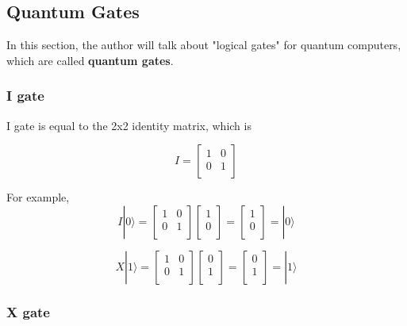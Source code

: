 \subsection{Quantum Gates}

 In this section, the author will talk about "logical gates" for quantum computers, which are called \textbf{quantum gates}.
 
\subsubsection{I gate}

I gate is equal to the 2x2 identity matrix, which is 

$$ I = \begin{bmatrix}
1 & 0 \\
0 & 1 \\
\end{bmatrix}
$$

For example,
$$ I|0\rangle = \begin{bmatrix}
1 & 0 \\
0 & 1 \\
\end{bmatrix} 
\left[
\begin{array}{c}
1 \\
0 \\
\end{array}
\right]
= \left[
\begin{array}{c}
1 \\
0 \\
\end{array}
\right]
= |0\rangle
$$

$$ X|1\rangle = \begin{bmatrix}
1 & 0 \\
0 & 1 \\
\end{bmatrix} 
\left[
\begin{array}{c}
0 \\
1  \\
\end{array}
\right]
= \left[
\begin{array}{c}
0 \\
1 \\
\end{array}
\right]
= |1\rangle
$$


\subsubsection{X gate}

